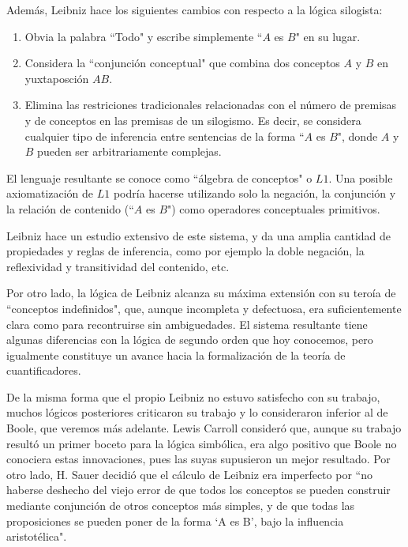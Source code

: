 \documentclass{article}
\begin{document}
Además, Leibniz hace los siguientes cambios con respecto a la lógica silogista:

\begin{enumerate}
    \item Obvia la palabra ``Todo" y escribe simplemente ``$A$ es $B$" en su lugar.
    \item Considera la ``conjunción conceptual" que combina dos conceptos $A$ y $B$ en yuxtaposción $AB$.
    \item Elimina las restriciones tradicionales relacionadas con el número de premisas y de conceptos en las premisas de un silogismo. Es decir, se considera cualquier tipo de inferencia entre sentencias de la forma ``$A$ es $B$", donde $A$ y $B$ pueden ser arbitrariamente complejas.
\end{enumerate}

El lenguaje resultante se conoce como ``álgebra de conceptos" o $L1$. Una posible axiomatización de $L1$ podría hacerse utilizando solo la negación, la conjunción y la relación de contenido (``$A$ es $B$") como operadores conceptuales primitivos.

Leibniz hace un estudio extensivo de este sistema, y da una amplia cantidad de propiedades y reglas de inferencia, como por ejemplo la doble negación, la reflexividad y transitividad del contenido, etc.

Por otro lado, la lógica de Leibniz alcanza su máxima extensión con su teroía de ``conceptos indefinidos", que, aunque incompleta y defectuosa, era suficientemente clara como para recontruirse sin ambiguedades. El sistema resultante tiene algunas diferencias con la lógica de segundo orden que hoy conocemos, pero igualmente constituye un avance hacia la formalización de la teoría de cuantificadores.

De la misma forma que el propio Leibniz no estuvo satisfecho con su trabajo, muchos lógicos posteriores criticaron su trabajo y lo consideraron inferior al de Boole, que veremos más adelante. Lewis Carroll consideró que, aunque su trabajo resultó un primer boceto para la lógica simbólica, era algo positivo que Boole no conociera estas innovaciones, pues las suyas supusieron un mejor resultado. Por otro lado, H. Sauer decidió que el cálculo de Leibniz era imperfecto por ``no haberse deshecho del viejo error de que todos los conceptos se pueden construir mediante conjunción de otros conceptos más simples, y de que todas las proposiciones se pueden poner de la forma `A es B', bajo la influencia aristotélica".
\end{document}
